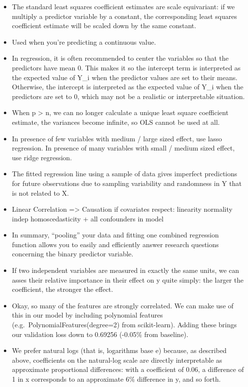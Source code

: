 \documentclass[]{book}
\theoremstyle{definition}
\theoremstyle{definition}
\theoremstyle{definition}
\theoremstyle{remark}
\begin{document}
\begin{itemize}
\item
  The standard least squares coefficient estimates are scale
  equivariant: if we multiply a predictor variable by a constant, the
  corresponding least squares coefficient estimate will be scaled down
  by the same constant.
\item
  Used when you're predicting a continuous value.
\item
  In regression, it is often recommended to center the variables so that
  the predictors have mean 0. This makes it so the intercept term is
  interpreted as the expected value of Y\_i when the predictor values
  are set to their means. Otherwise, the intercept is interpreted as the
  expected value of Y\_i when the predictors are set to 0, which may not
  be a realistic or interpretable situation.
\item
  When p \textgreater{} n, we can no longer calculate a unique least
  square coefficient estimate, the variances become infinite, so OLS
  cannot be used at all.
\item
  In presence of few variables with medium / large sized effect, use
  lasso regression. In presence of many variables with small / medium
  sized effect, use ridge regression.
\item
  The fitted regression line using a sample of data gives imperfect
  predictions for future observations due to sampling variability and
  randomness in Y that is not related to X.
\item
  Linear Correlation =\textgreater{} Causation if covariates respect:
  linearity normality indep homoscedasticity + all confounders in model
\item
  In summary, ``pooling'' your data and fitting one combined regression
  function allows you to easily and efficiently answer research
  questions concerning the binary predictor variable.
\item
  If two independent variables are measured in exactly the same units,
  we can asses their relative importance in their effect on y quite
  simply: the larger the coefficient, the stronger the effect.
\item
  Okay, so many of the features are strongly correlated. We can make use
  of this in our model by including polynomial features
  (e.g.~PolynomialFeatures(degree=2) from scikit-learn). Adding these
  brings our validation loss down to 0.69256 (-0.05\% from baseline).
\item
  We prefer natural logs (that is, logarithms base e) because, as
  described above, coefficients on the natural-log scale are directly
  interpretable as approximate proportional differences: with a
  coefficient of 0.06, a difference of 1 in x corresponds to an
  approximate 6\% difference in y, and so forth.
\end{itemize}
\end{document}
